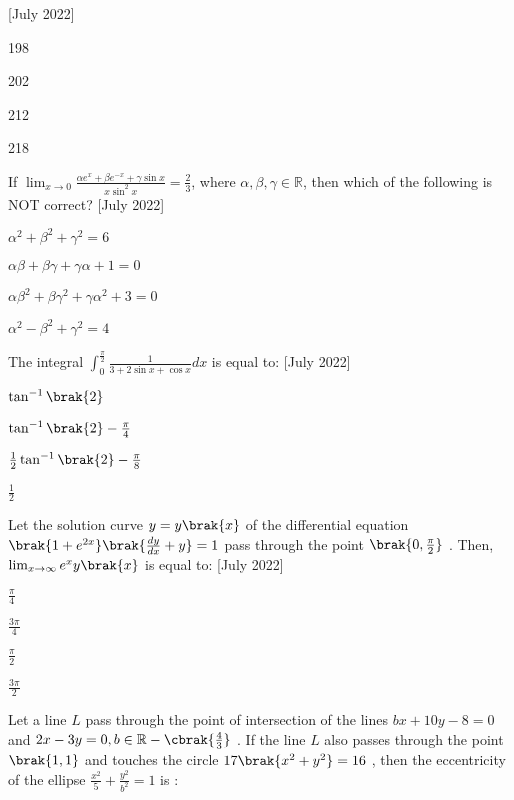  \hfill[July 2022]
 \begin{enumerate}
     \begin{multicols}{2}
         \item 198
         \item 202
         \item 212
         \item 218
     \end{multicols}
 \end{enumerate}
 \item If $\lim_{x\to 0} \frac{\alpha e^x + \beta e^{-x} + \gamma \sin{x}}{x \sin ^2 x} = \frac{2}{3}$, where $\alpha, \beta, \gamma \in \mathbb{R}$, then which of the following is NOT correct? \hfill [July 2022]
 \begin{enumerate}
     \begin{multicols}{2}
         \item $\alpha ^2 + \beta ^2 + \gamma ^2 = 6$
         \item $\alpha\beta + \beta\gamma + \gamma\alpha + 1 = 0$
         \item $\alpha\beta ^2 + \beta \gamma ^2 + \gamma\alpha ^2 + 3 = 0$
         \item $\alpha^2 - \beta ^2 + \gamma^2 =4$
     \end{multicols}
 \end{enumerate}
 \item The integral $\int_0^{\frac{\pi}{2}} \frac{1}{3 + 2 \sin{x} + \cos{x}}dx$ is equal to: \hfill [July 2022]
 \begin{enumerate}
     \begin{multicols}{4}
         \item $\tan^{-1}\brak{2}$
         \item $\tan^{-1}\brak{2} - \frac{\pi}{4}$
         \item $\frac{1}{2}\tan^{-1}\brak{2} - \frac{\pi}{8}$
         \item $\frac{1}{2}$
     \end{multicols}
 \end{enumerate}
 \item Let the solution curve $y = y\brak{x}$
 of the differential equation $\brak{1 + e^{2x}}\brak{\frac{dy}{dx} + y} = 1$
 pass through the point $\brak{0,\frac{\pi}{2}}$ 
. Then,  $\lim_{x \to \infty} e^x y\brak{x}$ is equal to: \hfill[July 2022]
\begin{enumerate}
    \begin{multicols}{4}
        \item $\frac{\pi}{4}$
        \item $\frac{3\pi}{4}$
        \item $\frac{\pi}{2}$
        \item $\frac{3\pi}{2}$
    \end{multicols}
\end{enumerate}
\item Let a line $L$ pass through the point of intersection of the lines $bx + 10y - 8 = 0$ and  $2x - 3y = 0, b \in \mathbb{R} - \cbrak{\frac{4}{3}}$
. If the line $L$
 also passes through the point $\brak{1,1}$
 and touches the circle $17\brak{x^2 + y^2} = 16$
, then the eccentricity of the ellipse $\frac{x^2}{5} + \frac{y^2}{b^2} = 1$ 
 is : 

